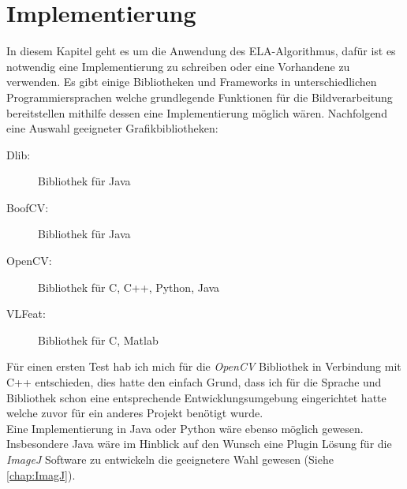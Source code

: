 
\chapter{Implementierung}
In diesem Kapitel geht es um die Anwendung des ELA-Algorithmus, dafür ist es notwendig eine Implementierung zu schreiben oder eine Vorhandene zu verwenden. Es gibt einige Bibliotheken und Frameworks in unterschiedlichen Programmiersprachen welche grundlegende Funktionen für die Bildverarbeitung bereitstellen mithilfe dessen eine Implementierung möglich wären. Nachfolgend eine Auswahl geeigneter Grafikbibliotheken:

\begin{description}
	\item[Dlib:] Bibliothek für Java
	\item[BoofCV:] Bibliothek für Java
	\item[OpenCV:] Bibliothek für C, C++, Python, Java
	\item[VLFeat:] Bibliothek für C, Matlab
\end{description}

Für einen ersten Test hab ich mich für die \emph{OpenCV} Bibliothek in Verbindung mit C++ entschieden, dies hatte den einfach Grund, dass ich für die Sprache und Bibliothek schon eine entsprechende Entwicklungsumgebung eingerichtet hatte welche zuvor für ein anderes Projekt benötigt wurde.\\
Eine Implementierung in Java oder Python wäre ebenso möglich gewesen. Insbesondere Java wäre im Hinblick auf den Wunsch eine Plugin Lösung für die \emph{ImageJ} Software zu entwickeln die geeignetere Wahl gewesen (Siehe \autoref{chap:ImagJ}). 

